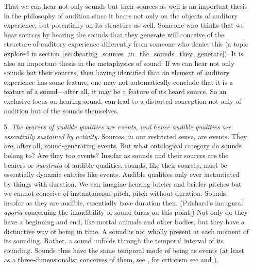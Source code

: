 \documentclass[12pt]{article}
\begin{document}
That we can hear not only sounds but their sources as well is an important thesis in the philosophy of audition since it bears not only on the objects of auditory experience, but potentially on its structure as well. Someone who thinks that we hear sources by hearing the sounds that they generate will conceive of the structure of auditory experience differently from someone who denies this (a topic explored in section~\ref{sec:hearing_sources_in_the_sounds_they_generate}). It is also an important thesis in the metaphysics of sound. If we can hear not only sounds but their sources, then having identified that an element of auditory experience has some feature, one may not automatically conclude that it is a feature of a sound---after all, it may be a feature of its heard source. So an exclusive focus on hearing sound, can lead to a distorted conception not only of audition but of the sounds themselves.

5. \emph{The bearers of audible qualities are events, and hence audible qualities are essentially sustained by activity.} Sources, in our restricted sense, are events. They are, after all, sound-generating events. But what ontological category do sounds belong to? Are they too events? Insofar as sounds and their sources are the bearers or \emph{substrata} of audible qualities, sounds, like their sources, must be essentially dynamic entities like events. Audible qualities only ever instantiated by things with duration. We can imagine hearing briefer and briefer pitches but we cannot conceive of instantaneous pitch, pitch without duration. Sounds, insofar as they are audible, essentially have duration then. (Prichard's \citeyear{Prichard:1950ly} inaugural \emph{aporia} concerning the inaudibility of sound turns on this point.) Not only do they have a beginning and end, like mortal animals and other bodies, but they have a distinctive way of being in time. A sound is not wholly present at each moment of its sounding. Rather, a sound unfolds through the temporal interval of its sounding. Sounds thus have the same temporal mode of being as events (at least as a three-dimensionalist conceives of them, see \citealt{Fine:2006fk}, for criticism see \citealt{Sider:1997fk} and \citealt{Hawthorne:2008uq}). 
\end{document}
